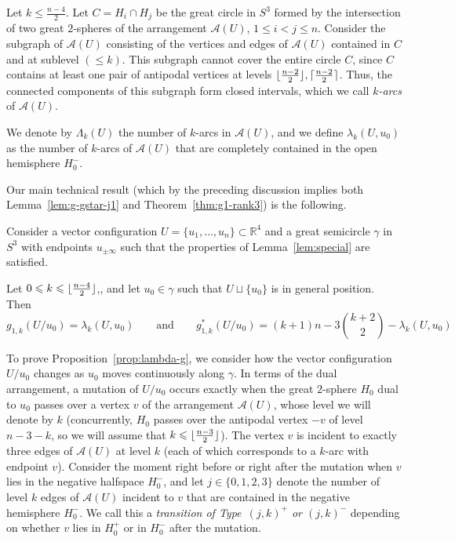 \documentclass[a4paper,USenglish,cleveref, autoref, thm-restate,nolineno]{socg-lipics-v2021}
\renewcommand{\leq}{\leqslant}
\newcommand{\R}{\mathbb{R}}
\DeclarePairedDelimiter\ceil{\lceil}{\rceil}
\DeclarePairedDelimiter\floor{\lfloor}{\rfloor}
\begin{document}
\begin{definition} 
\label{def:k-arcs}
Let $k\leq \frac{n-4}{2}$. Let $C=H_i\cap H_j$ be the great circle in $S^3$ formed by the intersection of two great $2$-spheres of the arrangement $\mathcal{A}(U)$, $1\leq i<j\leq n$. Consider the subgraph of $\mathcal{A}(U)$ consisting of the vertices and edges of $\mathcal{A}(U)$ contained in $C$ and at sublevel $(\leq k)$. This subgraph cannot cover the entire circle $C$, since $C$ contains at least one pair of antipodal vertices at levels $\floor{\frac{n-2}{2}}, \ceil{\frac{n-2}{2}}$. Thus, the connected components of this subgraph form closed intervals, which we call \emph{$k$-arcs} of $\mathcal{A}(U)$. 

We denote by  $\Lambda_k(U)$ the number of $k$-arcs in $\mathcal{A}(U)$, and we define $\lambda_k(U,u_0)$ as the number of $k$-arcs of $\mathcal{A}(U)$ that are completely contained in the open hemisphere $H_0^-$.
\end{definition}
Our main technical result (which by the preceding discussion implies both Lemma~\ref{lem:g-gstar-j1} and Theorem~\ref{thm:g1-rank3}) is the following. 
\begin{proposition}
\label{prop:lambda-g}
Consider a vector configuration $U=\{u_1,\dots,u_n\} \subset \R^4$ and a great semicircle $\gamma$ in $S^3$ with endpoints $u_{\pm \infty}$ such that the properties of Lemma~\ref{lem:special} are satisfied. 

Let $0\leq k\leq \floor{\frac{n-4}{2}}$,, and let $u_0\in \gamma$ such that $U\sqcup \{u_0\}$ is in general position. Then
\[
g_{1,k}(U/u_0)=\lambda_k(U,u_0)\qquad \textrm{and}\qquad g^*_{1,k}(U/u_0)=(k+1)n-3\binom{k+2}{2}-\lambda_k(U,u_0)
\]
\end{proposition}

To prove Proposition~\ref{prop:lambda-g}, we consider how the vector configuration $U/u_0$ changes as $u_0$ moves continuously along $\gamma$. In terms of the dual arrangement, a mutation of $U/u_0$ occurs exactly when the great $2$-sphere $H_0$ dual to $u_0$ passes over a vertex $v$ of the arrangement 
$\mathcal{A}(U)$, whose level we will denote by $k$ (concurrently, $H_0$ passes over the antipodal vertex $-v$ of level $n-3-k$, so we will assume that $k\leq \floor{\frac{n-3}{2}}$). The vertex $v$ is incident to exactly three edges of $\mathcal{A}(U)$ at level $k$ (each of which corresponds to a $k$-arc with endpoint $v$). Consider the moment right before or right after the mutation when $v$ lies in the negative halfspace $H_0^-$, and let $j\in \{0,1,2,3\}$ denote the number of level $k$ edges of $\mathcal{A}(U)$ incident to $v$ that are contained in the negative hemisphere $H_0^-$. We call this a \emph{transition of Type~$(j,k)^+$ or $(j,k)^-$} depending on whether $v$ lies in $H_0^+$ or in $H_0^-$ after the mutation.
\end{document}
